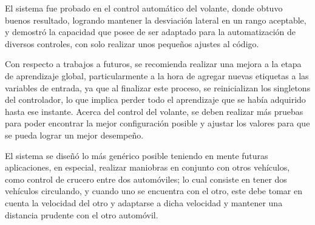 El sistema fue probado en el control automático del volante, donde obtuvo buenos resultado, logrando mantener la desviación lateral en un rango aceptable, y demostró la capacidad que posee de ser adaptado para la automatización de diversos controles, con solo realizar unos pequeños ajustes al código.

Con respecto a trabajos a futuros, se recomienda realizar una mejora a la etapa de aprendizaje global, particularmente a la hora de agregar nuevas etiquetas a las variables de entrada, ya que al finalizar este proceso, se reinicializan los singletons del controlador, lo que implica perder todo el aprendizaje que se había adquirido hasta ese instante. Acerca del control del volante, se deben realizar más pruebas para poder encontrar la mejor configuración posible y ajustar los valores para que se pueda lograr un mejor desempeño. 

El sistema se diseñó lo más genérico posible teniendo en mente futuras aplicaciones, en especial, realizar maniobras en conjunto con otros vehículos, como control de crucero entre dos automóviles; lo cual consiste en tener dos vehículos circulando, y cuando uno se encuentra con el otro, este debe tomar en cuenta la velocidad del otro y adaptarse a dicha velocidad y mantener una distancia prudente con el otro automóvil.